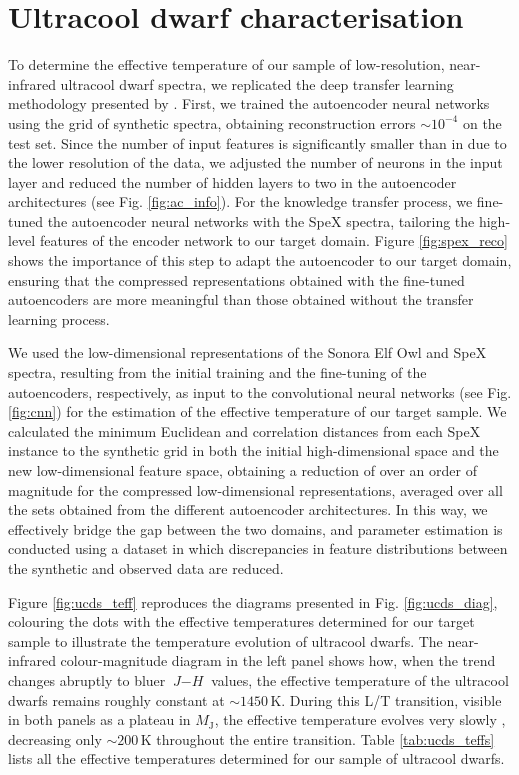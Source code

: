 \section{Ultracool dwarf characterisation}

To determine the effective temperature of our sample of low-resolution, near-infrared ultracool dwarf spectra, we replicated the deep transfer learning methodology presented by \citet{masbuitrago2024}. First, we trained the autoencoder neural networks using the grid of synthetic spectra, obtaining reconstruction errors $\sim10^{-4}$ on the test set. Since the number of input features is significantly smaller than in \citet{masbuitrago2024} due to the lower resolution of the data, we adjusted the number of neurons in the input layer and reduced the number of hidden layers to two in the autoencoder architectures (see Fig. \ref{fig:ac_info}). For the knowledge transfer process, we fine-tuned the autoencoder neural networks with the SpeX spectra, tailoring the high-level features of the encoder network to our target domain. Figure \ref{fig:spex_reco} shows the importance of this step to adapt the autoencoder to our target domain, ensuring that the compressed representations obtained with the fine-tuned autoencoders are more meaningful than those obtained without the transfer learning process.

We used the low-dimensional representations of the Sonora Elf Owl and SpeX spectra, resulting from the initial training and the fine-tuning of the autoencoders, respectively, as input to the convolutional neural networks (see Fig. \ref{fig:cnn}) for the estimation of the effective temperature of our target sample. We calculated the minimum Euclidean and correlation distances  from each SpeX instance to the synthetic grid in both the initial high-dimensional space and the new low-dimensional feature space, obtaining a reduction of over an order of magnitude for the compressed low-dimensional representations, averaged over all the sets obtained from the different autoencoder architectures. In this way, we effectively bridge the gap between the two domains, and parameter estimation is conducted using a dataset in which discrepancies in feature distributions between the synthetic and observed data are reduced.


Figure \ref{fig:ucds_teff} reproduces the diagrams presented in Fig. \ref{fig:ucds_diag}, colouring the dots with the effective temperatures determined for our target sample to illustrate the temperature evolution of ultracool dwarfs. The near-infrared colour-magnitude diagram in the left panel shows how, when the trend changes abruptly to bluer $\textit{J}-\textit{H}$ values, the effective temperature of the ultracool dwarfs remains roughly constant at $\sim1450$\,K. During this L/T transition, visible in both panels as a plateau in $M_{\mathrm{J}}$, the effective temperature evolves very slowly \citep{golimovsky2004,kirkpatrick2021}, decreasing only $\sim200$\,K throughout the entire transition. Table \ref{tab:ucds_teffs} lists all the effective temperatures determined for our sample of ultracool dwarfs.

